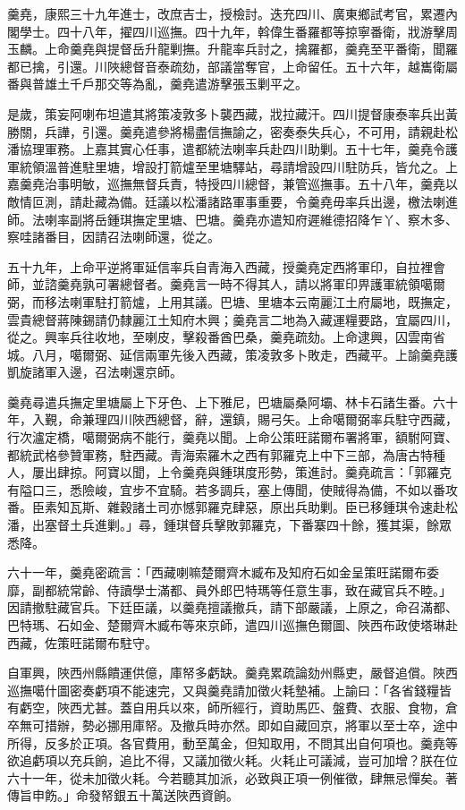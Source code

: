 \begin{pinyinscope}
羹堯，康熙三十九年進士，改庶吉士，授檢討。迭充四川、廣東鄉試考官，累遷內閣學士。四十八年，擢四川巡撫。四十九年，斡偉生番羅都等掠寧番衛，戕游擊周玉麟。上命羹堯與提督岳升龍剿撫。升龍率兵討之，擒羅都，羹堯至平番衛，聞羅都已擒，引還。川陜總督音泰疏劾，部議當奪官，上命留任。五十六年，越巂衛屬番與普雄土千戶那交等為亂，羹堯遣游擊張玉剿平之。

是歲，策妄阿喇布坦遣其將策凌敦多卜襲西藏，戕拉藏汗。四川提督康泰率兵出黃勝關，兵譁，引還。羹堯遣參將楊盡信撫諭之，密奏泰失兵心，不可用，請親赴松潘協理軍務。上嘉其實心任事，遣都統法喇率兵赴四川助剿。五十七年，羹堯令護軍統領溫普進駐里塘，增設打箭爐至里塘驛站，尋請增設四川駐防兵，皆允之。上嘉羹堯治事明敏，巡撫無督兵責，特授四川總督，兼管巡撫事。五十八年，羹堯以敵情叵測，請赴藏為備。廷議以松潘諸路軍事重要，令羹堯毋率兵出邊，檄法喇進師。法喇率副將岳鍾琪撫定里塘、巴塘。羹堯亦遣知府遲維德招降乍丫、察木多、察哇諸番目，因請召法喇師還，從之。

五十九年，上命平逆將軍延信率兵自青海入西藏，授羹堯定西將軍印，自拉裡會師，並諮羹堯孰可署總督者。羹堯言一時不得其人，請以將軍印畀護軍統領噶爾弼，而移法喇軍駐打箭爐，上用其議。巴塘、里塘本云南麗江土府屬地，既撫定，雲貴總督蔣陳錫請仍隸麗江土知府木興；羹堯言二地為入藏運糧要路，宜屬四川，從之。興率兵往收地，至喇皮，擊殺番酋巴桑，羹堯疏劾。上命逮興，囚雲南省城。八月，噶爾弼、延信兩軍先後入西藏，策凌敦多卜敗走，西藏平。上諭羹堯護凱旋諸軍入邊，召法喇還京師。

羹堯尋遣兵撫定里塘屬上下牙色、上下雅尼，巴塘屬桑阿壩、林卡石諸生番。六十年，入覲，命兼理四川陜西總督，辭，還鎮，賜弓矢。上命噶爾弼率兵駐守西藏，行次瀘定橋，噶爾弼病不能行，羹堯以聞。上命公策旺諾爾布署將軍，額駙阿寶、都統武格參贊軍務，駐西藏。青海索羅木之西有郭羅克上中下三部，為唐古特種人，屢出肆掠。阿寶以聞，上令羹堯與鍾琪度形勢，策進討。羹堯疏言：「郭羅克有隘口三，悉險峻，宜步不宜騎。若多調兵，塞上傳聞，使賊得為備，不如以番攻番。臣素知瓦斯、雜穀諸土司亦憾郭羅克肆惡，原出兵助剿。臣已移鍾琪令速赴松潘，出塞督土兵進剿。」尋，鍾琪督兵擊敗郭羅克，下番寨四十餘，獲其渠，餘眾悉降。

六十一年，羹堯密疏言：「西藏喇嘛楚爾齊木臧布及知府石如金呈策旺諾爾布委靡，副都統常齡、侍讀學士滿都、員外郎巴特瑪等任意生事，致在藏官兵不睦。」因請撤駐藏官兵。下廷臣議，以羹堯擅議撤兵，請下部嚴議，上原之，命召滿都、巴特瑪、石如金、楚爾齊木臧布等來京師，遣四川巡撫色爾圖、陜西布政使塔琳赴西藏，佐策旺諾爾布駐守。

自軍興，陜西州縣饋運供億，庫帑多虧缺。羹堯累疏論劾州縣吏，嚴督追償。陜西巡撫噶什圖密奏虧項不能速完，又與羹堯請加徵火耗墊補。上諭曰：「各省錢糧皆有虧空，陜西尤甚。蓋自用兵以來，師所經行，資助馬匹、盤費、衣服、食物，倉卒無可措辦，勢必挪用庫帑。及撤兵時亦然。即如自藏回京，將軍以至士卒，途中所得，反多於正項。各官費用，動至萬金，但知取用，不問其出自何項也。羹堯等欲追虧項以充兵餉，追比不得，又議加徵火耗。火耗止可議減，豈可加增？朕在位六十一年，從未加徵火耗。今若聽其加派，必致與正項一例催徵，肆無忌憚矣。著傳旨申飭。」命發帑銀五十萬送陜西資餉。


\end{pinyinscope}
